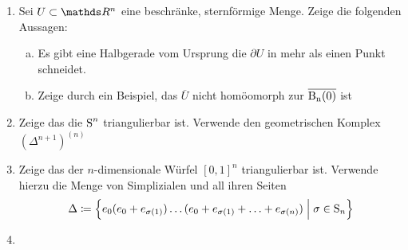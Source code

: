 \documentclass[ngerman]{scrartcl}
\begin{document}
\begin{Beh}
  \begin{enumerate}[(1)]
    \item Sei $U \subset \R^n$ eine beschränke, sternförmige Menge. Zeige 
      die folgenden Aussagen:
      \begin{enumerate}[a)]
        \item Es gibt eine Halbgerade vom Ursprung die $\partial U$ in mehr
          als einen Punkt schneidet.
        \item Zeige durch ein Beispiel, das $\overline{U}$ nicht homöomorph zur
          $\operatorname{\overline{\operatorname{B}_{n}(0)}}$ ist
      \end{enumerate}
    \item Zeige das die $\operatorname{S}^n$ triangulierbar ist. Verwende den
      geometrischen Komplex $(\Delta^{n+1})^{(n)}$
    \item Zeige das der $n$-dimensionale Würfel $[0,1]^n$
      triangulierbar ist.  Verwende hierzu die Menge von Simplizialen
      und all ihren Seiten
      \begin{gather*}
        \Delta \coloneqq \left\{  e_0 (e_0 + e_{\sigma(1)}) \ldots (e_0 +
          e_{\sigma(1)} + \ldots + e_{\sigma(n)})  \; \Big| \;  \sigma \in \operatorname{S}_n \right\}
      \end{gather*}
    \item 
    \end{enumerate}
\end{Beh}

\end{document}
